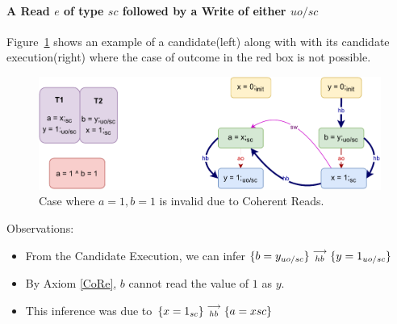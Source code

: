         
    
    \paragraph{A Read $e$ of type $sc$ followed by a Write of either $uo/sc$}
        
        Figure~\ref{reord_counter:example2(a)} shows an example of a candidate(left) along with with its candidate execution(right) where the case of outcome in the red box is not possible. 
        \begin{figure}[H]
            \centering
            \includegraphics[scale=0.7]{5.InstructionReordering/4.ValidReorderingCandidate/Example3(Rsc-Wuo,sc).pdf}
            \caption{Case where $a = 1, b = 1$ is invalid due to Coherent Reads.}
            \label{reord_counter:example2(a)}
        \end{figure}

        Observations:
        \begin{itemize}
            \item From the Candidate Execution, we can infer $\{b=y_{uo/sc}\}\stackrel{\longrightarrow}{_{hb}}\{y=1_{uo/sc}\}$
            \item By Axiom \ref{CoRe}, $b$ cannot read the value of $1$ as $y$. 
            \item This inference was due to $\{x=1_{sc}\}\stackrel{\longrightarrow}{_{hb}}\{a=x{sc}\}$
        \end{itemize}

